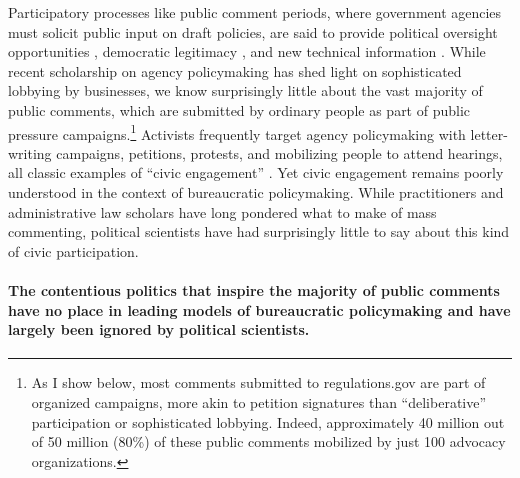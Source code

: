 \documentclass[
      12pt,
        ]{article}
\begin{document}
Participatory processes like public comment periods, where government
agencies must solicit public input on draft policies, are said to provide political oversight opportunities \citep{Balla1998, Mccubbins1984}, democratic legitimacy \citep{Croley2003, Rosenbloom2003}, and new technical information \citep{Yackee2006JPART, Nelson2012}. While recent scholarship on agency policymaking has shed light on sophisticated lobbying by businesses, we know surprisingly little about the vast majority of public comments, which are submitted by ordinary people as part of public pressure campaigns.\footnote{
  As I show below, most comments submitted to
  regulations.gov are part of organized campaigns, more akin to petition signatures than ``deliberative'' participation or sophisticated lobbying. Indeed, approximately 40 million out of
  50 million (80\%) of these public comments mobilized by just 100
  advocacy organizations.}
Activists frequently target agency policymaking with letter-writing campaigns, petitions, protests,
and mobilizing people to attend hearings, all classic examples of ``civic engagement'' \citep{Verba1987}. Yet civic engagement remains poorly understood in the context of bureaucratic policymaking.
While practitioners and administrative law scholars have long pondered
what to make of mass commenting, political scientists have had
surprisingly little to say about this kind of civic participation.

\hypertarget{the-contentious-politics-that-inspire-the-majority-of-public-comments-have-no-place-in-leading-models-of-bureaucratic-policymaking-and-have-largely-been-ignored-by-political-scientists.}{%
\paragraph{The contentious politics that inspire the majority of public comments have no place in leading models of bureaucratic policymaking and have largely been ignored by political scientists.}\label{the-contentious-politics-that-inspire-the-majority-of-public-comments-have-no-place-in-leading-models-of-bureaucratic-policymaking-and-have-largely-been-ignored-by-political-scientists.}}
\end{document}
